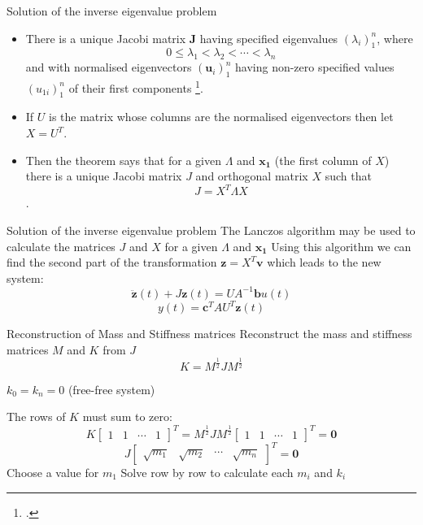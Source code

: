 \documentclass{beamer}
\begin{document}
\begin{frame}{Solution of the inverse eigenvalue problem}
\begin{itemize}
\item There is a unique Jacobi matrix $\mathbf{J}$ having specified eigenvalues $(\lambda_i)_1^n$, where
$$
0 \leq \lambda_1<\lambda_2< \cdots <\lambda_n
$$
and with normalised eigenvectors $(\mathbf{u}_i)_1^n$  having non-zero specified values $(u_{1i})_1^n$ of their first components \footcite{gladwell1986inverse}.
\item If $U$ is the matrix whose columns are the normalised eigenvectors then let $X = U^T$.
\item Then the theorem says that for a given $\Lambda$ and $\mathbf{x_1}$ (the first column of $X$) there is a unique Jacobi matrix $J$ and orthogonal matrix $X$ such that $$J = X^T \Lambda X$$.
\end{itemize}
\end{frame}

\begin{frame}{Solution of the inverse eigenvalue problem}
The Lanczos algorithm may be used to calculate the matrices $J$ and $X$ for a given $\Lambda$ and $\mathbf{x_1}$
\vspace{0.5cm}
Using this algorithm we can find the second part of the transformation $\mathbf{z} = X^T \mathbf{v}$ which leads to the new system:
\begin{equation}
\ddot{\mathbf{z}}(t) + J \mathbf{z}(t) =   U A^{-1} \mathbf{b} u(t)
\end{equation}
\begin{equation}
y(t) = \mathbf{c}^T  A U^T \mathbf{z}(t)
\end{equation}
\end{frame}

\begin{frame}{Reconstruction of Mass and Stiffness matrices}
Reconstruct the mass and stiffness matrices $M$ and $K$ from $J$
$$K = M^{\frac{1}{2}} J M^{\frac{1}{2}}$$

$k_0 = k_n = 0$ (free-free system)

\vspace{0.5cm}
The rows of $K$ must sum to zero:
\begin{equation}
K \begin{bmatrix} 1 & 1 & \cdots & 1 \end{bmatrix}^T =  M^{\frac{1}{2}} J M^{\frac{1}{2}} \begin{bmatrix} 1 & 1 & \cdots & 1 \end{bmatrix}^T = \mathbf{0}
\end{equation} 
\begin{equation}
J \begin{bmatrix} \sqrt{m_1} & \sqrt{m_2} & \cdots & \sqrt{m_n} \end{bmatrix}^T = \mathbf{0}
\end{equation}
Choose a value for $m_1$
Solve row by row to calculate each $m_i$ and $k_i$
\end{frame}
\end{document}

